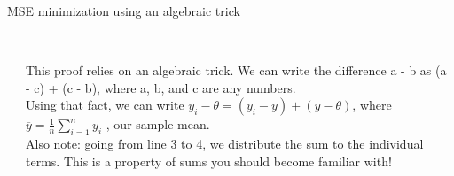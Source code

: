\documentclass[aspectratio=169]{../latex_main/tntbeamer}  %
\begin{document}
\begin{frame}{MSE minimization using an algebraic trick}
\begin{columns}
\begin{column}{.65\textwidth}
	                   
	                   
	        \end{column}
	        
	        
	        \begin{column}{.35\textwidth}
	                   \\
	                   \vspace{-.5cm}
	                This proof relies on an algebraic trick. We can write the difference a - b as 
                    (a - c) + (c - b), where a, b, and c are any numbers.\\
                    \bigskip
                    Using that fact, we can write
                     $y_i - \theta = (y_i - \overline{y}) +  (\overline{y} -\theta)$, where
                    $\overline{y} = \frac{1}{n} \sum_{i=1}^ny_i $ , our sample mean.\\
                    \bigskip
                    Also note: going from line 3 to 4, we distribute the sum to the individual terms. This is a property of sums you should become familiar with!
	        \end{column}
	    \end{columns}
	\end{frame}
	
	
	
\end{document}
